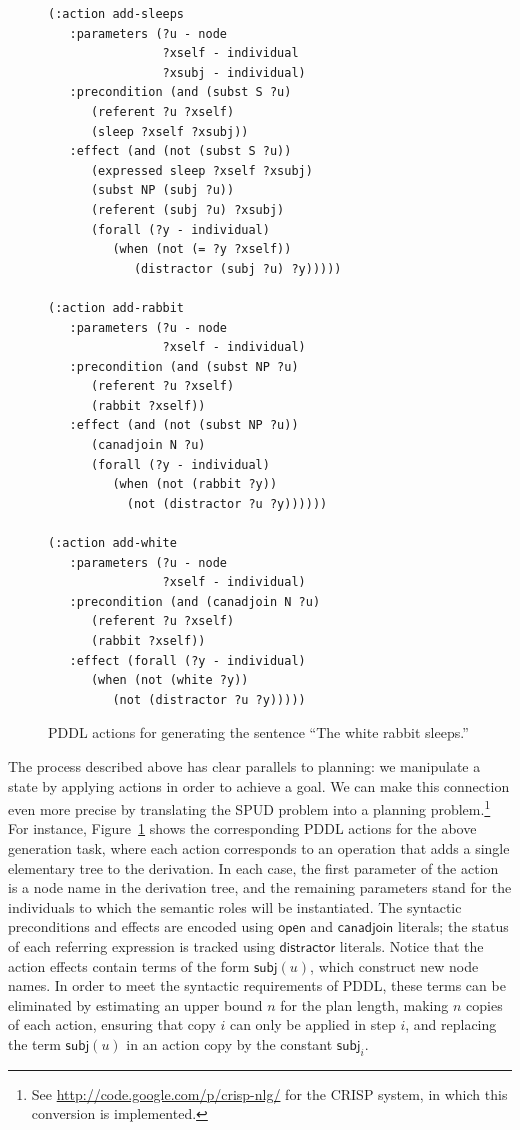 \begin{figure}[t]
\centering
{\small%
\begin{verbatim}
(:action add-sleeps
   :parameters (?u - node
                ?xself - individual
                ?xsubj - individual)
   :precondition (and (subst S ?u)
      (referent ?u ?xself)
      (sleep ?xself ?xsubj))
   :effect (and (not (subst S ?u))
      (expressed sleep ?xself ?xsubj)
      (subst NP (subj ?u))
      (referent (subj ?u) ?xsubj)
      (forall (?y - individual)
         (when (not (= ?y ?xself))
            (distractor (subj ?u) ?y)))))

(:action add-rabbit
   :parameters (?u - node
                ?xself - individual)
   :precondition (and (subst NP ?u)
      (referent ?u ?xself)
      (rabbit ?xself))
   :effect (and (not (subst NP ?u))
      (canadjoin N ?u)
      (forall (?y - individual)
         (when (not (rabbit ?y))
           (not (distractor ?u ?y))))))

(:action add-white
   :parameters (?u - node
                ?xself - individual)
   :precondition (and (canadjoin N ?u)
      (referent ?u ?xself)
      (rabbit ?xself))
   :effect (forall (?y - individual)
      (when (not (white ?y))
         (not (distractor ?u ?y)))))
\end{verbatim}}%
\caption{PDDL actions for generating the sentence ``The white rabbit
sleeps.''}
\label{fig:white-rabbit-as-planning}
\end{figure}


The process described above has clear parallels to planning: we
manipulate a state by applying actions in order to achieve a goal. We
can make this connection even more precise by translating the SPUD
problem into a planning problem.\footnote{See
  \url{http://code.google.com/p/crisp-nlg/} for the CRISP system, in
  which this conversion is implemented.}  For instance,
Figure~\ref{fig:white-rabbit-as-planning} shows the corresponding PDDL
actions for the above generation task, where each action corresponds
to an operation that adds a single elementary tree to the derivation.
In each case, the first parameter of the action is a node name in the
derivation tree, and the remaining parameters stand for the
individuals to which the semantic roles will be instantiated.  The
syntactic preconditions and effects are encoded using $\mathsf{open}$
and $\mathsf{canadjoin}$ literals; the status of each referring
expression is tracked using $\mathsf{distractor}$ literals. Notice
that the action effects contain terms of the form $\mathsf{subj}(u)$,
which construct new node names. In order to meet the syntactic
requirements of PDDL, these terms can be eliminated by estimating an
upper bound $n$ for the plan length, making $n$ copies of each action,
ensuring that copy $i$ can only be applied in step $i$, and replacing
the term $\mathsf{subj}(u)$ in an action copy by the constant
$\mathsf{subj}_i$.

